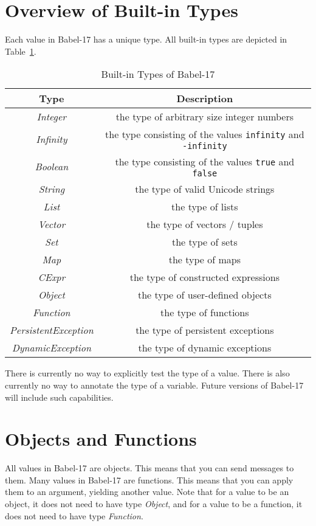 \documentclass[11pt]{amsart}
\newcommand{\metababel}[1] {\textsl{#1}}
\newcommand{\babelsrc}[1] {\lstinline!#1!}
\begin{document}
\section{Overview of Built-in Types}
Each value in Babel-17 has a unique type. All built-in types are depicted in Table~\ref{table:builtintypes}.
\begin{table}
\caption{Built-in Types of Babel-17}
\begin{tabular}{c|c}
\textbf{Type} & \textbf{Description}\\\hline
\metababel {Integer} & the type of arbitrary size integer numbers\\
\metababel{Infinity} & the type consisting of the values \babelsrc{infinity} and \babelsrc{-infinity}\\
\metababel{Boolean} & the type consisting of the values \babelsrc{true} and \babelsrc{false}\\
\metababel{String} & the type of valid Unicode strings\\
\metababel{List} & the type of lists\\
\metababel{Vector} & the type of vectors / tuples\\
\metababel{Set} & the type of sets \\
\metababel{Map}& the type of maps \\
\metababel{CExpr} & the type of constructed expressions\\
\metababel{Object} & the type of user-defined objects\\
\metababel{Function} & the type of  functions\\
\metababel{PersistentException} & the type of persistent exceptions\\
\metababel{DynamicException} & the type of dynamic exceptions\\
\end{tabular}
\label{table:builtintypes}
\end{table}
There is currently no way to explicitly test the type of a value. There is also currently no way to annotate the type of a variable.
Future versions of Babel-17 will include such capabilities.

\section{Objects and Functions}
All values in Babel-17 are objects. This means that you can send messages to them. Many values in Babel-17 are functions. This means that you can apply them to an argument, yielding another value. Note that for a value to be an object, it does not need to have type \metababel{Object}, and for a value to be a function,  it does not need to have type \metababel{Function}. 
\end{document}
